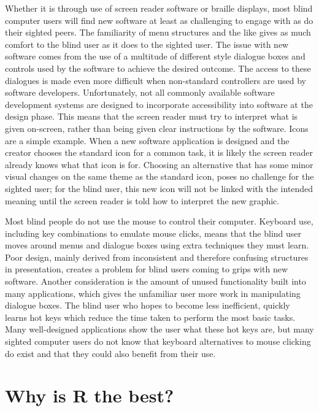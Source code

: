 Whether it is through use of screen reader software or braille displays, most blind computer users will find new software at least as challenging to engage with as do their sighted peers. The familiarity of menu structures and the like gives as much comfort to the blind user as it does to the sighted user. The issue with new software comes from the use of a multitude of different style dialogue boxes and controls used by the software to achieve the desired outcome. The access to these dialogues is made even more difficult when non-standard controllers are used by software developers. Unfortunately, not all commonly available software development systems are designed to incorporate accessibility into software at the design phase. This means that the screen reader must try to interpret what is given on-screen, rather than being given clear instructions by the software. Icons are a simple example. When a new software application is designed and the creator chooses the standard icon for a common task, it is likely the screen reader already knows what that icon is for. Choosing an alternative that has some minor visual changes on the same theme as the standard icon, poses no challenge for the sighted user; for the blind user, this new icon will not be linked with the intended meaning until the screen reader is told how to interpret the new graphic. 

Most blind people do not use the mouse to control their computer. Keyboard use, including key combinations to emulate mouse clicks, means that the blind user moves around menus and dialogue boxes using extra techniques they must learn. Poor design, mainly derived from inconsistent and therefore confusing structures in presentation, creates a problem for blind users coming to grips with new software. Another consideration is the amount of unused functionality built into many applications, which gives  the unfamiliar user more work in manipulating dialogue boxes. The blind user who hopes to become less inefficient, quickly learns hot keys which reduce the time taken to perform the most basic tasks. Many well-designed applications show the user what these hot keys are, but many sighted computer users do not know that keyboard alternatives to mouse clicking do exist and that they could also benefit from their use.




\section{Why is R the best?}


